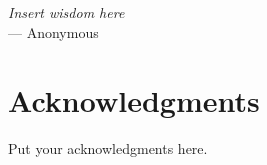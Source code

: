 
\begin{flushright}{\slshape
    Insert wisdom here} \\ \medskip
    --- Anonymous
\end{flushright}



\bigskip

\begingroup
\let\clearpage\relax
\let\cleardoublepage\relax
\let\cleardoublepage\relax
\chapter*{Acknowledgments}
Put your acknowledgments here.


\endgroup



